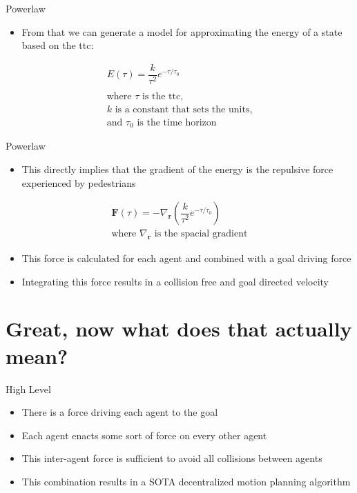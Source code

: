 \documentclass[aspectratio=169,xcolor=dvipsnames]{beamer}
\begin{document}
\begin{frame}{Powerlaw}
  \begin{itemize}
    \item From that we can generate a model for approximating the energy of a state based on the ttc:
  \end{itemize}
  \begin{gather*}
    E(\tau) = \dfrac{k}{\tau^{2}} e^{-\tau / \tau_{0}}\\\\
    \text{where $\tau$ is the ttc,}\\
    \text{$k$ is a constant that sets the units,}\\
    \text{and $\tau_{0}$ is the time horizon}
  \end{gather*}
\end{frame}

\begin{frame}{Powerlaw}
  \begin{itemize}
    \item This directly implies that the gradient of the energy is the repulsive force experienced by pedestrians
  \end{itemize}
  \begin{gather*}
    \mathbf{F}(\tau) = - \nabla_{\mathbf{r}}\left( \dfrac{k}{\tau^{2}} e^{-\tau / \tau_{0}} \right)\\
    \text{where $\nabla_{\mathbf{r}}$ is the spacial gradient}
  \end{gather*}
  \begin{itemize}
    \item This force is calculated for each agent and combined with a goal driving force
    \item Integrating this force results in a collision free and goal directed velocity
  \end{itemize}
\end{frame}

\section{Great, now what does that actually mean?}

\begin{frame}{High Level}
  \begin{itemize}
    \item There is a force driving each agent to the goal
    \item Each agent enacts some sort of force on every other agent
    \item This inter-agent force is sufficient to avoid all collisions between agents
    \item This combination results in a SOTA decentralized motion planning algorithm
  \end{itemize}
\end{frame}
\end{document}
